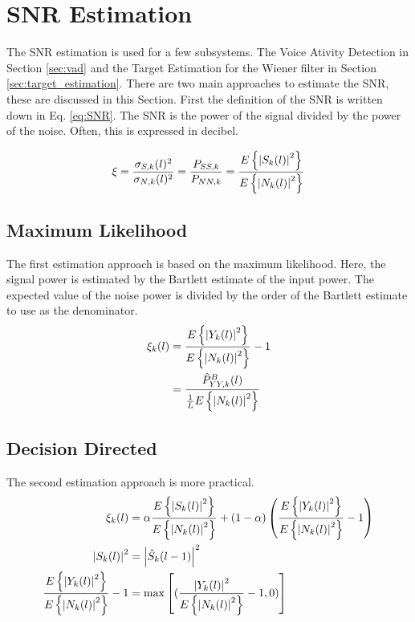 \section{SNR Estimation} \label{sec:snr_estimation}
The SNR estimation is used for a few subsystems. The Voice Ativity Detection in Section \ref{sec:vad} and the Target Estimation for the Wiener filter in Section \ref{sec:target_estimation}. There are two main approaches to estimate the SNR, these are discussed in this Section.
First the definition of the SNR is written down in Eq. \ref{eq:SNR}. The SNR is the power of the signal divided by the power of the noise. Often, this is expressed in decibel.

\begin{equation}
  \xi = \frac{\sigma_{S,k}(l)^{2}}{\sigma_{N,k}(l)^{2}} =
  \frac{P_{SS,k}}{P_{NN,k}} =
  \frac{E\left\{\abs{S_{k}(l)}^{2}\right\}}{E\left\{\abs{N_{k}(l)}^{2}\right\}}
  \label{eq:SNR}
\end{equation}

\subsection{Maximum Likelihood}
The first estimation approach is based on the maximum likelihood. Here, the signal power is estimated by the Bartlett estimate of the input power. The expected value of the noise power is divided by the order of the Bartlett estimate to use as the denominator.
\begin{align}
  \xi_{k}(l) &= \frac{E\left\{\abs{Y_{k}(l)}^{2}\right\}}{E\left\{\abs{N_{k}(l)}^{2}\right\}} - 1
  \label{eq:ML1}\\
  &= \frac{\hat P_{YY,k}^{B}(l)}{\frac{1}{L}E\left\{\abs{N_{k}(l)}^{2}\right\}}
  \label{eq:M2}
\end{align}

\subsection{Decision Directed}
The second estimation approach is more practical. 
\begin{align}
  \xi_{k}(l) &= \alpha \frac{E\left\{\abs{S_{k}(l)}^{2}\right\}}{E\left\{\abs{N_{k}(l)}^{2}\right\}} +
  (1-\alpha)\left(\frac{E\left\{\abs{Y_{k}(l)}^{2}\right\}}{E\left\{\abs{N_{k}(l)}^{2}\right\}} - 1\right)
  \label{eq:dd1}\\
  \abs{S_{k}(l)}^{2} &= \abs{\hat S_{k}(l-1)}^{2}
  \label{eq:dd2} \\
  \frac{E\left\{\abs{Y_{k}(l)}^{2}\right\}}{E\left\{\abs{N_{k}(l)}^{2}\right\}} - 1 &=
  \max \left[(\frac{\abs{Y_{k}(l)}^{2}}{E\left\{\abs{N_{k}(l)}^{2}\right\}}-1,0)\right]
\end{align}
